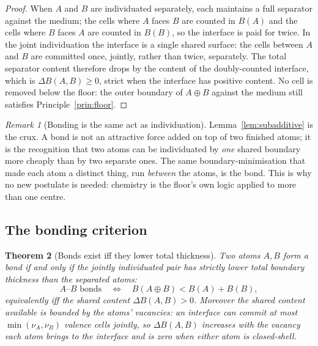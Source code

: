 \documentclass[11pt,a4paper]{article}
\theoremstyle{thmstyle}
\newtheorem{theorem}{Theorem}[section]
\theoremstyle{definition}
\theoremstyle{remark}
\newtheorem{remark}[theorem]{Remark}
\newcommand{\thick}{B}                 %
\newcommand{\vac}{\nu}                 %
\begin{document}
\begin{proof}
When $A$ and $B$ are individuated separately, each maintains a full
separator against the medium; the cells where $A$ faces $B$ are counted in
$\thick(A)$ and the cells where $B$ faces $A$ are counted in $\thick(B)$,
so the interface is paid for twice. In the joint individuation the
interface is a single shared surface: the cells between $A$ and $B$ are
committed once, jointly, rather than twice, separately. The total
separator content therefore drops by the content of the doubly-counted
interface, which is $\Delta\thick(A,B)\ge0$, strict when the interface
has positive content. No cell is removed below the floor: the outer
boundary of $A\!\oplus\!B$ against the medium still satisfies
Principle~\ref{prin:floor}.
\end{proof}

\begin{remark}[Bonding is the same act as individuation]
\label{rem:same-act}
Lemma~\ref{lem:subadditive} is the crux. A bond is not an attractive
force added on top of two finished atoms; it is the recognition that two
atoms can be individuated by \emph{one} shared boundary more cheaply than
by two separate ones. The same boundary-minimisation that made each atom a
distinct thing, run \emph{between} the atoms, is the bond. This is why no
new postulate is needed: chemistry is the floor's own logic applied to
more than one centre.
\end{remark}

\subsection{The bonding criterion}

\begin{theorem}[Bonds exist iff they lower total thickness]
\label{thm:bond}
Two atoms $A,B$ form a bond if and only if the jointly individuated pair
has strictly lower total boundary thickness than the separated atoms:
\[
\boxed{\;A\text{--}B\text{ bonds}\quad\Longleftrightarrow\quad
\thick(A\!\oplus\!B)<\thick(A)+\thick(B),\;}
\]
equivalently iff the shared content $\Delta\thick(A,B)>0$. Moreover the
shared content available is bounded by the atoms' vacancies: an interface
can commit at most $\min(\vac_A,\vac_B)$ valence cells jointly, so
$\Delta\thick(A,B)$ increases with the vacancy each atom brings to the
interface and is zero when either atom is closed-shell.
\end{theorem}
\end{document}
